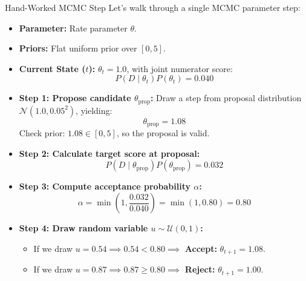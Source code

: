 \documentclass[9pt]{beamer}
\begin{document}
\begin{frame}{Hand-Worked MCMC Step}
  Let's walk through a single MCMC parameter step:
  \begin{itemize}
    \item \textbf{Parameter:} Rate parameter $\theta$.
    \item \textbf{Priors:} Flat uniform prior over $[0, 5]$.
    \item \textbf{Current State ($t$):} $\theta_t = 1.0$, with joint numerator score:
      $$P(D \mid \theta_t) P(\theta_t) = 0.040$$
    \item \textbf{Step 1: Propose candidate $\theta_{\text{prop}}$:}
      Draw a step from proposal distribution $\mathcal{N}(1.0, 0.05^2)$, yielding:
      $$\theta_{\text{prop}} = 1.08$$
      Check prior: $1.08 \in [0, 5]$, so the proposal is valid.
    \item \textbf{Step 2: Calculate target score at proposal:}
      $$P(D \mid \theta_{\text{prop}}) P(\theta_{\text{prop}}) = 0.032$$
    \item \textbf{Step 3: Compute acceptance probability $\alpha$:}
      $$\alpha = \min\left(1, \frac{0.032}{0.040}\right) = \min(1, 0.80) = 0.80$$
    \item \textbf{Step 4: Draw random variable $u \sim \mathcal{U}(0, 1)$:}
      \begin{itemize}
        \item If we draw $u = 0.54 \implies 0.54 < 0.80 \implies$ \textbf{Accept:} $\theta_{t+1} = 1.08$.
        \item If we draw $u = 0.87 \implies 0.87 \ge 0.80 \implies$ \textbf{Reject:} $\theta_{t+1} = 1.00$.
      \end{itemize}
  \end{itemize}
\end{frame}
\end{document}
